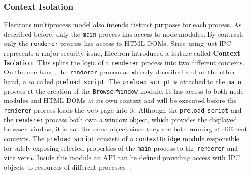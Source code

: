 \subsubsection{Context Isolation}
Electrons multiprocess model also intends distinct purposes for each process.
As described before, only the \texttt{main} process has access to node modules.
By contrast, only the \texttt{renderer} process has access to \ac{HTML} \ac{DOM}s.
Since using just \ac{IPC} represents a major security issue, Electron introduced a feature called \textbf{Context Isolation}.
This splits the logic of a \texttt{renderer} process into two different contexts.
On the one hand, the \texttt{renderer} process as already described and on the other hand, a so called \texttt{preload script}.
The \texttt{preload script} is attached to the \texttt{main} process at the creation of the \texttt{BrowserWindow} module.
It has access to both node modules and \ac{HTML} \ac{DOM}s at its own context and will be executed before the \texttt{renderer} process loads the web page into it.
Although the \texttt{preload script} and the \texttt{renderer} process both own a window object, which provides the displayed browser window, it is not the same object since they are both running at
different contexts.
The \texttt{preload script} consists of a \texttt{contextBridge} module responsible for safely exposing selected properties of the \texttt{main} process to the \texttt{renderer} and vice versa.
Inside this module an \ac{API} can be defined providing access with \ac{IPC} objects to resources of different processes~\cite{ElectronDoc}.

